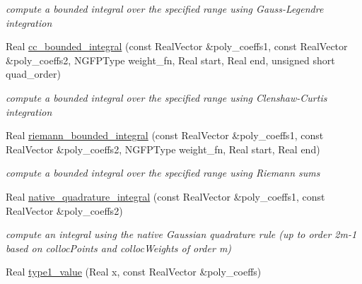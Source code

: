 \begin{DoxyCompactItemize}
\begin{DoxyCompactList}\small\item\em compute a bounded integral over the specified range using Gauss-\/\+Legendre integration \end{DoxyCompactList}\item 
Real \hyperlink{classPecos_1_1NumericGenOrthogPolynomial_ab9e633f52b778c0e737b90852cb0ab31}{cc\+\_\+bounded\+\_\+integral} (const Real\+Vector \&poly\+\_\+coeffs1, const Real\+Vector \&poly\+\_\+coeffs2, N\+G\+F\+P\+Type weight\+\_\+fn, Real start, Real end, unsigned short quad\+\_\+order)\label{classPecos_1_1NumericGenOrthogPolynomial_ab9e633f52b778c0e737b90852cb0ab31}

\begin{DoxyCompactList}\small\item\em compute a bounded integral over the specified range using Clenshaw-\/\+Curtis integration \end{DoxyCompactList}\item 
Real \hyperlink{classPecos_1_1NumericGenOrthogPolynomial_a0c1eb0747d53f80138f824d23a61d42a}{riemann\+\_\+bounded\+\_\+integral} (const Real\+Vector \&poly\+\_\+coeffs1, const Real\+Vector \&poly\+\_\+coeffs2, N\+G\+F\+P\+Type weight\+\_\+fn, Real start, Real end)\label{classPecos_1_1NumericGenOrthogPolynomial_a0c1eb0747d53f80138f824d23a61d42a}

\begin{DoxyCompactList}\small\item\em compute a bounded integral over the specified range using Riemann sums \end{DoxyCompactList}\item 
Real \hyperlink{classPecos_1_1NumericGenOrthogPolynomial_a0cf9a7908a8f181ea6109a0e9e70de2a}{native\+\_\+quadrature\+\_\+integral} (const Real\+Vector \&poly\+\_\+coeffs1, const Real\+Vector \&poly\+\_\+coeffs2)\label{classPecos_1_1NumericGenOrthogPolynomial_a0cf9a7908a8f181ea6109a0e9e70de2a}

\begin{DoxyCompactList}\small\item\em compute an integral using the native Gaussian quadrature rule (up to order 2m-\/1 based on colloc\+Points and colloc\+Weights of order m) \end{DoxyCompactList}\item 
Real \hyperlink{classPecos_1_1NumericGenOrthogPolynomial_a36a2f2a688905b357c9aec50c32934e2}{type1\+\_\+value} (Real x, const Real\+Vector \&poly\+\_\+coeffs)\label{classPecos_1_1NumericGenOrthogPolynomial_a36a2f2a688905b357c9aec50c32934e2}


\end{DoxyCompactItemize}
